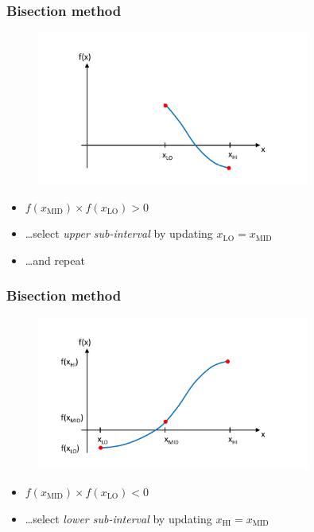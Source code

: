 \documentclass[english,14pt]{beamer}
\begin{document}
\begin{frame}[fragile]

\frametitle{Bisection method}

\vspace*{-15mm}
\begin{figure}[ht]
	\centering
	\includegraphics[width=0.8\textwidth]{figures/bisection2}
\end{figure}
\vspace*{-10mm}
\begin{itemize}
\item[] $f(x_\mathrm{MID}) \times f(x_\mathrm{LO}) > 0$
\item[] \ldots select \emph{upper sub-interval} by updating $x_\mathrm{LO} = x_\mathrm{MID}$
\item[] \quad\ldots and repeat
\end{itemize}

\end{frame}


\begin{frame}[fragile]

\frametitle{Bisection method}

\vspace*{-15mm}
\begin{figure}[ht]
	\centering
	\includegraphics[width=0.8\textwidth]{figures/bisection3}
\end{figure}
\vspace*{-10mm}
\begin{itemize}
\item[] $f(x_\mathrm{MID}) \times f(x_\mathrm{LO}) < 0$
\item[] \ldots select \emph{lower sub-interval} by updating $x_\mathrm{HI} = x_\mathrm{MID}$
\end{itemize}

\end{frame}
\end{document}
